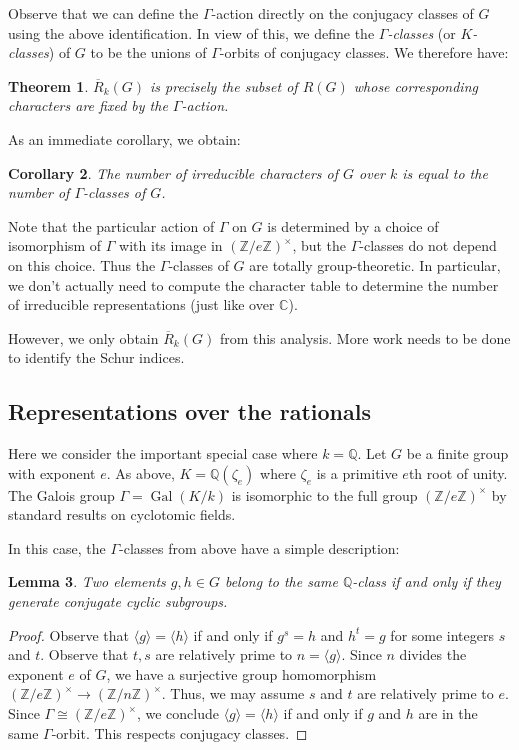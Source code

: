 \documentclass[12pt]{article}
\theoremstyle{plain}
\newtheorem{theorem}{Theorem}[section]
\newtheorem{lemma}[theorem]{Lemma}
\newtheorem{corollary}[theorem]{Corollary}
\theoremstyle{definition}
\theoremstyle{remark}
\numberwithin{equation}{section}
\begin{document}
Observe that we can define the $\Gamma$-action directly on the conjugacy
classes of $G$ using the above identification.
In view of this, we define the \emph{$\Gamma$-classes}
(or \emph{$K$-classes}) of $G$ to be the unions of $\Gamma$-orbits of
conjugacy classes.
We therefore have:

\begin{theorem}
$\overline{R}_k(G)$ is precisely the subset of $R(G)$ whose corresponding
characters are fixed by the $\Gamma$-action.
\end{theorem}

As an immediate corollary, we obtain:

\begin{corollary}
The number of irreducible characters of $G$ over $k$
is equal to the number of $\Gamma$-classes of $G$.
\end{corollary}

Note that the particular action of $\Gamma$ on $G$ is determined by a
choice of isomorphism of $\Gamma$ with its image in
$(\mathbb{Z}/e\mathbb{Z})^\times$, but the $\Gamma$-classes do not
depend on this choice.
Thus the $\Gamma$-classes of $G$ are totally group-theoretic.
In particular, we don't actually need to compute the character table
to determine the number of irreducible representations (just like over
$\mathbb{C}$).

However, we only obtain $\overline{R}_k(G)$ from this analysis.
More work needs to be done to identify the Schur indices.

\subsection{Representations over the rationals}

Here we consider the important special case where $k=\mathbb{Q}$.
Let $G$ be a finite group with exponent $e$.
As above, $K=\mathbb{Q}(\zeta_e)$ where $\zeta_e$ is a primitive $e$th
root of unity.
The Galois group $\Gamma = \operatorname{Gal}(K/k)$ is isomorphic
to the full group $(\mathbb{Z}/e\mathbb{Z})^\times$ by standard results
on cyclotomic fields.

In this case, the $\Gamma$-classes from above have a simple description:

\begin{lemma}
Two elements $g,h \in G$ belong to the same $\mathbb{Q}$-class if and
only if they generate conjugate cyclic subgroups.
\end{lemma}

\begin{proof}
Observe that $\langle g \rangle = \langle h \rangle$ if and only if
$g^s = h$ and $h^t= g$ for some integers $s$ and $t$.
Observe that $t,s$ are relatively prime to $n=\langle g \rangle$.
Since $n$ divides the exponent $e$ of $G$, we have a surjective group
homomorphism
$(\mathbb{Z}/e\mathbb{Z})^\times \to (\mathbb{Z}/n\mathbb{Z})^\times$.
Thus, we may assume $s$ and $t$ are relatively prime to $e$.
Since $\Gamma \cong (\mathbb{Z}/e\mathbb{Z})^\times$,
we conclude $\langle g \rangle = \langle h \rangle$ if and only if
$g$ and $h$ are in the same $\Gamma$-orbit.
This respects conjugacy classes. 
\end{proof}
\end{document}
